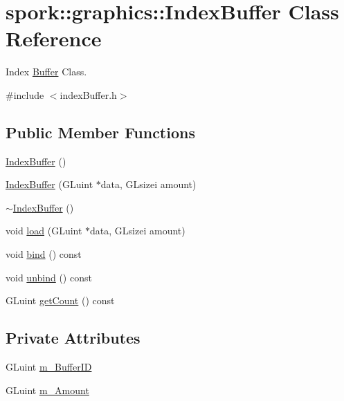 \hypertarget{classspork_1_1graphics_1_1_index_buffer}{}\section{spork\+:\+:graphics\+:\+:Index\+Buffer Class Reference}
\label{classspork_1_1graphics_1_1_index_buffer}


Index \hyperlink{classspork_1_1graphics_1_1_buffer}{Buffer} Class.  




{\ttfamily \#include $<$index\+Buffer.\+h$>$}

\subsection*{Public Member Functions}
\begin{DoxyCompactItemize}
\item 
\hyperlink{classspork_1_1graphics_1_1_index_buffer_a64febef0695096a943e1908c492820cb}{Index\+Buffer} ()
\item 
\hyperlink{classspork_1_1graphics_1_1_index_buffer_ac2bef171af04aee11910d8c98cda4060}{Index\+Buffer} (G\+Luint $\ast$data, G\+Lsizei amount)
\item 
\hyperlink{classspork_1_1graphics_1_1_index_buffer_a809bdf93c52d3dcedbc22e359e58e57b}{$\sim$\+Index\+Buffer} ()
\item 
void \hyperlink{classspork_1_1graphics_1_1_index_buffer_a124700de4463970ec9537d4be947687c}{load} (G\+Luint $\ast$data, G\+Lsizei amount)
\item 
void \hyperlink{classspork_1_1graphics_1_1_index_buffer_ada428fd283ea348d4f1abcc7ccbf56d6}{bind} () const
\item 
void \hyperlink{classspork_1_1graphics_1_1_index_buffer_a4d2cd37268b47c1705ba36a8034b4f93}{unbind} () const
\item 
G\+Luint \hyperlink{classspork_1_1graphics_1_1_index_buffer_ac0c40faf8553284aa68e2a894e620b5a}{get\+Count} () const
\end{DoxyCompactItemize}
\subsection*{Private Attributes}
\begin{DoxyCompactItemize}
\item 
G\+Luint \hyperlink{classspork_1_1graphics_1_1_index_buffer_a98bb89453d6aa9c3cf5941abc4276330}{m\+\_\+\+Buffer\+ID}
\item 
G\+Luint \hyperlink{classspork_1_1graphics_1_1_index_buffer_aa4732fff43b9517bc9923a7c9aae2026}{m\+\_\+\+Amount}
\end{DoxyCompactItemize}



